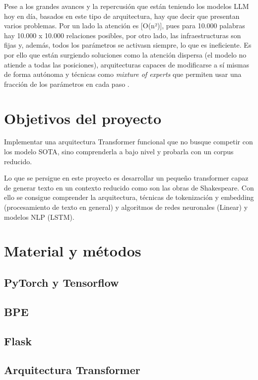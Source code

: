 \documentclass[11pt]{book}
\newcommand{\clearemptydoublepage}{\newpage{\pagestyle{empty}\cleardoublepage}}
\theoremstyle{plain}
\theoremstyle{definition}
\begin{document}
Pese a los grandes avances y la repercusión que están teniendo los modelos LLM hoy en día, basados en este tipo de arquitectura, hay que decir que presentan varios problemas. Por un lado la atención es [O(n²)], pues para 10.000 palabras hay 10.000 x 10.000 relaciones posibles, por otro lado, las infraestructuras son fijas y, además, todos los parámetros se activasn siempre, lo que es ineficiente. Es por ello que están surgiendo soluciones como la atención dispersa (el modelo no atiende a todas las posiciones), arquitecturas capaces de modificarse a sí mismas de forma autónoma y técnicas como \textit{mixture of experts} que permiten usar una fracción de los parámetros en cada paso \parencite{plainenglish2021gpt}.

\clearemptydoublepage

\chapter{Objetivos del proyecto}
Implementar una arquitectura Transformer funcional que no busque competir
con los modelo SOTA, sino comprenderla a bajo nivel y probarla con un corpus
reducido.


Lo que se persigue en este proyecto es desarrollar un pequeño transformer capaz
de generar texto en un contexto reducido como son las obras de Shakespeare. Con
ello se consigue comprender la arquitectura, técnicas de tokenización y embedding
(procesamiento de texto en general) y algoritmos de redes neuronales (Linear) y
modelos NLP (LSTM).


\clearemptydoublepage

\chapter{Material y métodos}
\section{PyTorch y Tensorflow}
\section{BPE}
\section{Flask}


\section{Arquitectura Transformer} \label{Arquitectura Transformer}
\end{document}
